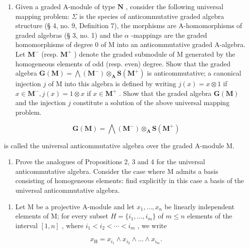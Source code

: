 \begin{enumerate}
\def\labelenumi{(\alph{enumi})}
\setcounter{enumi}{1}
\tightlist
\item
  Given a graded A-module of type \(\mathbf{N}\) , consider the following universal mapping problem: \(\Sigma\) is the species of anticommutative graded algebra structure (§ 4, no. 9, Definition 7), the morphisms are A-homomorphisms of graded algebras (§ 3, no. 1) and the \(\alpha\) -mappings are the graded homomorphisms of degree 0 of M into an anticommutative graded A-algebra. Let \(\mathbf{M}^{-}\) (resp. \(\mathbf{M}^{+}\) ) denote the graded submodule of M generated by the homogeneous elements of odd (resp. even) degree. Show that the graded algebra \(\mathbf{G}(\mathbf{M}) = \bigwedge (\mathbf{M}^{-}) \otimes_{\mathbf{A}} \mathbf{S}(\mathbf{M}^{+})\) is anticommutative; a canonical injection \(j\) of M into this algebra is defined by writing \(j(x) = x \otimes 1\) if \(x \in \mathbf{M}^{-}, j(x) = 1 \otimes x\) if \(x \in \mathbf{M}^{+}\) . Show that the graded algebra \(\mathbf{G}(\mathbf{M})\) and the injection \(j\) constitute a solution of the above universal mapping problem.
\end{enumerate}

\[
\mathbf {G} (\mathbf {M}) = \bigwedge (\mathbf {M} ^ {-}) \otimes_ {\mathbf {A}} \mathbf {S} (\mathbf {M} ^ {+})
\]

is called the universal anticommutative algebra over the graded A-module M.

\begin{enumerate}
\def\labelenumi{(\alph{enumi})}
\setcounter{enumi}{2}
\tightlist
\item
  Prove the analogues of Propositions 2, 3 and 4 for the universal anticommutative algebra. Consider the case where M admits a basis consisting of homogeneous elements: find explicitly in this case a basis of the universal anticommutative algebra.
\end{enumerate}

\begin{enumerate}
\def\labelenumi{\arabic{enumi}.}
\setcounter{enumi}{13}
\tightlist
\item
  Let M be a projective A-module and let \(x_{1}, \ldots, x_{n}\) be linearly independent elements of M; for every subset \(H = \{i_{1}, \ldots, i_{m}\}\) of \(m \leqslant n\) elements of the interval \([1, n]\) , where \(i_{1} < i_{2} < \cdots < i_{m}\) , we write
\end{enumerate}

\[
x _ {\mathrm{H}} = x _ {i _ {1}} \wedge x _ {i _ {2}} \wedge \dots \wedge x _ {i _ {m}}.
\]

